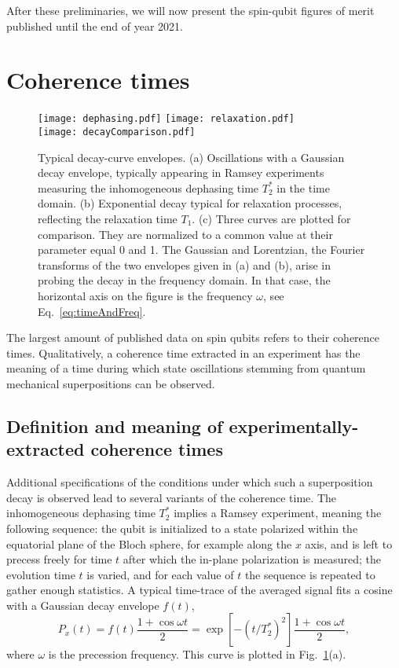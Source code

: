 \documentclass[aps, prx, showpacs, twocolumn, superscriptaddress, notitlepage, longbibliography, floatfix, nofootinbib]{revtex4-2}
\newcommand{\recheck}[1]{{#1}}
\newcommand{\separate}[1]
{
 #1
}
\begin{document}
\separate{
After these preliminaries, we will now present the spin-qubit figures of merit published until \recheck{the end of year 2021}.
}

\section{Coherence times}

\label{sec:coherence}

\begin{figure}
\centering
  \texttt{[image: dephasing.pdf]} \hfill
  \texttt{[image: relaxation.pdf]} \hfill\\
  \texttt{[image: decayComparison.pdf]} \hfill
  \caption{\label{fig:envelopes} Typical decay-curve envelopes. (a) Oscillations with a Gaussian decay envelope, typically appearing in Ramsey experiments measuring the inhomogeneous dephasing time $T_2^*$ in the time domain. (b) Exponential decay typical for relaxation processes, reflecting the relaxation time $T_1$. (c) Three curves are plotted for comparison. They are normalized to a common value at their parameter equal 0 and 1. The Gaussian and Lorentzian, the Fourier transforms of the two envelopes given in (a) and (b), arise in probing the decay in the frequency domain. In that case, the horizontal axis on the figure is the frequency $\omega$, see Eq.~\eqref{eq:timeAndFreq}.}
\end{figure}

The largest amount of published data on spin qubits refers to their coherence times. Qualitatively, a coherence time extracted in an experiment has the meaning of a time during which state oscillations stemming from quantum mechanical superpositions can be observed. 

\subsection{Definition and meaning of experimentally-extracted coherence times}

Additional specifications of the conditions under which such a superposition decay is observed lead to several variants of the coherence time. The inhomogeneous dephasing time $T_2^*$ implies a Ramsey experiment, meaning the following sequence: the qubit is initialized to a state polarized within the equatorial plane of the Bloch sphere, for example along the $x$ axis, and is left to precess freely for time $t$ after which the in-plane polarization is measured; the evolution time $t$ is varied, and for each value of $t$ the sequence is repeated to gather enough statistics. A typical time-trace of the averaged signal fits a cosine with a Gaussian decay envelope $f(t)$,
\begin{equation}
P_x(t) = f(t)\frac{1+\cos \omega t}{2} = \exp\left[-(t / T_2^*)^2\right] \frac{1+\cos \omega t}{2},
\label{eq:dephasing}
\end{equation}
where $\omega$ is the precession frequency. This curve is plotted in Fig.~\ref{fig:envelopes}(a). 
\end{document}
